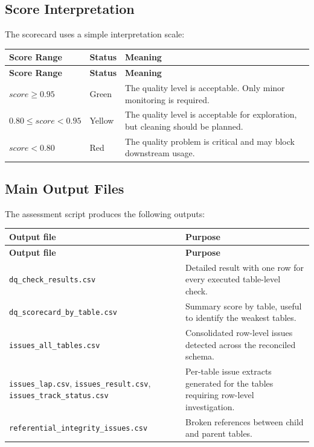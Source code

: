 \documentclass[a4paper,11pt]{article}
\begin{document}
	\subsection{Score Interpretation}
	
	The scorecard uses a simple interpretation scale:
	
	\begin{longtable}{p{5cm}p{3cm}p{8cm}}
		\toprule
		\textbf{Score Range} & \textbf{Status} & \textbf{Meaning} \\
		\midrule
		\endfirsthead
		\toprule
		\textbf{Score Range} & \textbf{Status} & \textbf{Meaning} \\
		\midrule
		\endhead
		$score \geq 0.95$ & Green & The quality level is acceptable. Only minor monitoring is required. \\
		\midrule
		$0.80 \leq score < 0.95$ & Yellow & The quality level is acceptable for exploration, but cleaning should be planned. \\
		\midrule
		$score < 0.80$ & Red & The quality problem is critical and may block downstream usage. \\
		\bottomrule
	\end{longtable}
	
	\subsection{Main Output Files}
	
	The assessment script produces the following outputs:
	
	\begin{longtable}{p{7cm}p{9cm}}
		\toprule
		\textbf{Output file} & \textbf{Purpose} \\
		\midrule
		\endfirsthead
		\toprule
		\textbf{Output file} & \textbf{Purpose} \\
		\midrule
		\endhead
		\texttt{dq\_check\_results.csv} & Detailed result with one row for every executed table-level check. \\
		\midrule
		\texttt{dq\_scorecard\_by\_table.csv} & Summary score by table, useful to identify the weakest tables. \\
		\midrule
		\texttt{issues\_all\_tables.csv} & Consolidated row-level issues detected across the reconciled schema. \\
		\midrule
		\texttt{issues\_lap.csv}, \texttt{issues\_result.csv}, \texttt{issues\_track\_status.csv} & Per-table issue extracts generated for the tables requiring row-level investigation. \\
		\midrule
		\texttt{referential\_integrity\_issues.csv} & Broken references between child and parent tables. \\
		\bottomrule
	\end{longtable}
	
\end{document}
